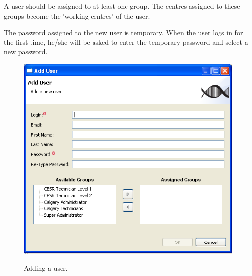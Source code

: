 A user should be assigned to at least one group. The centres assigned to these groups
become the 'working centres' of the user.

The password assigned to the new user is temporary. When the user logs in for
the first time, he/she will be asked to enter the temporary password and
select a new password.
\begin{figure}[H]
  \centering
  \scalebox{0.5}
	   { \includegraphics*{screenshots/administration/add_user} }
	   \caption{Adding a user.}
	   \label{fig:add_user}
\end{figure}


